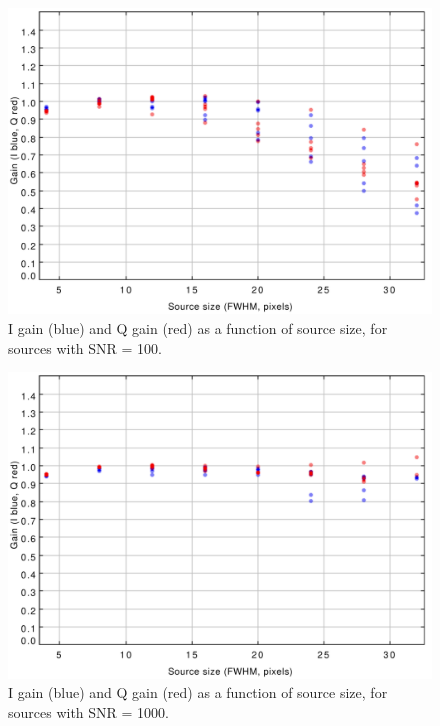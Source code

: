 \documentclass[twoside,11pt]{starlink}
\begin{document}
\begin{figure}
\includegraphics[width=0.9\columnwidth]{figs/snr100}
\caption{I gain (blue) and Q gain (red) as a function of source size, for
sources with SNR = 100.}
\label{fig:snr100}
\end{figure}


\begin{figure}
\includegraphics[width=0.9\columnwidth]{figs/snr1000}
\caption{I gain (blue) and Q gain (red) as a function of source size, for
sources with SNR = 1000.}
\label{fig:snr1000}
\end{figure}
\end{document}
